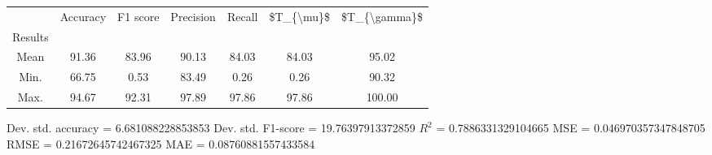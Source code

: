 \begin{tabular}{|c|c|c|c|c|c|c|}
\toprule
{} &  Accuracy &  F1 score &  Precision &  Recall &  \$T\_\{\textbackslash mu\}\$ &  \$T\_\{\textbackslash gamma\}\$ \\
Results &           &           &            &         &            &               \\
\hline
Mean    &     91.36 &     83.96 &      90.13 &   84.03 &      84.03 &         95.02 \\
Min.    &     66.75 &      0.53 &      83.49 &    0.26 &       0.26 &         90.32 \\
Max.    &     94.67 &     92.31 &      97.89 &   97.86 &      97.86 &        100.00 \\
\bottomrule
\end{tabular}

 Dev. std. accuracy = 6.681088228853853
 Dev. std. F1-score = 19.76397913372859
 $R^2$ = 0.7886331329104665
 MSE = 0.046970357347848705
 RMSE = 0.21672645742467325
 MAE = 0.08760881557433584